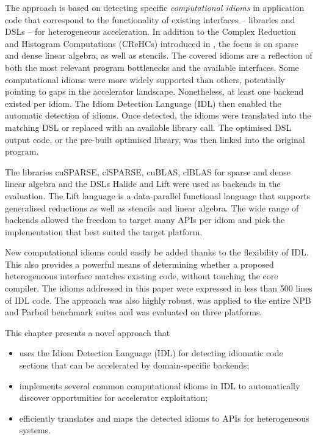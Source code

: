     The approach is based on detecting specific {\em computational idioms} in
    application code that correspond to the functionality of existing interfaces
    -- libraries and DSLs -- for heterogeneous acceleration.
    In addition to the Complex Reduction and Histogram Computations (CReHCs)
    introduced in , the focus is on
    sparse and dense linear algebra, as well as stencils.
    The covered idioms are a reflection of both the most relevant program
    bottlenecks and the available interfaces.
    Some computational idioms were more widely supported than others, potentially
    pointing to gaps in the accelerator landscape.
    Nonetheless, at least one backend existed per idiom.
    The Idiom Detection Language (IDL) then enabled the automatic detection of
    idioms.\linebreak
    Once detected, the idioms were translated into the matching DSL or
    replaced with an available library call.
    The optimised DSL output code, or the pre-built optimised library, was then
    linked into the original program.

    The libraries cuSPARSE, clSPARSE, cuBLAS, clBLAS for sparse and dense linear
    algebra and the DSLs Halide \cite{Ragan-Kelley2013Halide} and Lift
    \cite{SteuwerRD17} were used as backends in the evaluation.
    The Lift language is a data-parallel functional language that supports
    generalised reductions as well as stencils and linear algebra.
    The wide range of backends allowed the freedom to target many APIs per idiom
    and pick the implementation that best suited the target platform.

    New computational idioms could easily be added thanks to the flexibility of
    IDL.
    This also provides a powerful means of determining whether a proposed
    heterogeneous interface matches existing code, without touching the core
    compiler.
    The idioms addressed in this paper were expressed in less than 500 lines
    of IDL code.
    The approach was also highly robust, was applied to the entire NPB
    and Parboil benchmark suites and was evaluated on three platforms.

    This chapter presents a novel approach that
    \begin{itemize}
    \item uses the Idiom Detection Language (IDL) for detecting idiomatic
          code sections that can be accelerated by domain-specific backends;
    \item implements several common computational idioms in IDL to automatically
          discover opportunities for accelerator exploitation;
    \item efficiently translates and maps the detected idioms to APIs for
          heterogeneous systems.
    \end{itemize}

